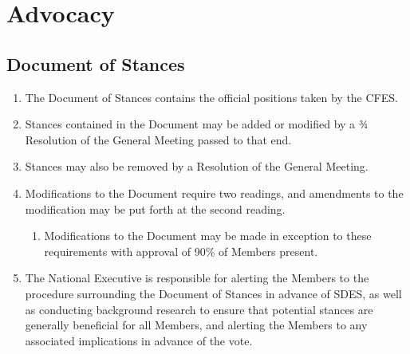 \section{Advocacy}
\label{advocacy}

\subsection{Document of Stances}
\label{advocacy-document-of-stances}

\begin{enumerate}
 \item The Document of Stances contains the official positions taken by the CFES.
 \item Stances contained in the Document may be added or modified by a ¾ Resolution of the General Meeting passed to that end.
 \item Stances may also be removed by a Resolution of the General Meeting.
 \item Modifications to the Document require two readings, and amendments to the modification may be put forth at the second reading.
  \begin{enumerate}
   \item Modifications to the Document may be made in exception to these requirements with approval of 90\% of Members present.
  \end{enumerate}
 \item The National Executive is responsible for alerting the Members to the procedure surrounding the Document of Stances in advance of SDES, as well as conducting background research to ensure that potential stances are generally beneficial for all Members, and alerting the Members to any associated implications in advance of the vote.
\end{enumerate}
